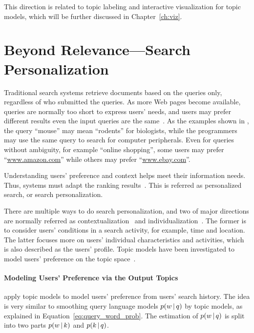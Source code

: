 This direction is related to topic labeling and
interactive visualization for topic models, which will be further
discussed in Chapter~\ref{ch:viz}.

\section{Beyond Relevance---Search Personalization}

Traditional search systems retrieve documents based on the queries
only, regardless of who submitted the queries.  As more Web pages
become available, queries are normally too short to express users'
needs, and users may prefer different results even the input queries
are the same~\citep{Jansen-2000,Dou-2007}.  As the examples shown in
\citet{Dou-2007}, the query ``mouse'' may mean ``rodents'' for
biologists, while the programmers may use the same query to search for
computer peripherals. Even for queries without ambiguity, for example
``online shopping'', some users may prefer ``\url{www.amazon.com}''
while others may prefer ``\url{www.ebay.com}''.

Understanding users' preference and context helps meet their
information needs.  Thus,  systems must adapt the ranking
results~\citep{Pitkow-2002,Micarelli-2007}.  This is
referred as personalized search, or search personalization.

There are multiple ways to do search personalization, and two of major
directions are normally referred as
contextualization~\citep{Melucci-2012} and
individualization~\citep{Pitkow-2002}. The former is to consider
users' conditions in a search activity, for example, time and
location.  The latter focuses more on users' individual
characteristics and activities, which is also described as the users'
profile.  Topic models have been investigated to model users'
preference on the topic space~\citep{Song-2010,Carman-2010}.

\paragraph{Modeling Users' Preference via the Output Topics}

\citet{Song-2010} apply topic models to model users' preference from
users' search history. The idea is very similar to smoothing query
language models $p(w \, | \, q)$ by topic models, as explained in
Equation~\ref{eq:query_word_prob}. The estimation of $p(w \, | \, q)$ is
split into two parts $p(w \, | \, k)$ and $p(k \, | \, q)$.

